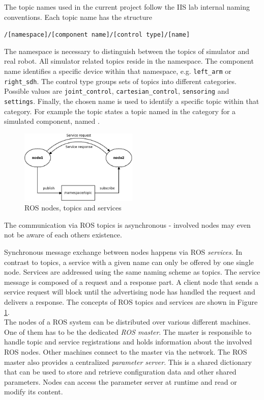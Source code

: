 The topic names used in the current project follow the IIS lab internal naming conventions. Each topic name has the structure
\begin{center}
\texttt{/[namespace]/[component name]/[control type]/[name]}
\end{center}
The namespace is necessary to distinguish between the topics of simulator and real robot. All simulator related topics reside in the  namespace. The component name identifies a specific device within that namespace, e.g. \texttt{left\_arm} or \texttt{right\_sdh}. The control type groups sets of topics into different categories. Possible values are \texttt{joint\_control}, \texttt{cartesian\_control}, \texttt{sensoring} and \texttt{settings}. Finally, the chosen name is used to identify a specific topic within that category. For example the topic  states a topic named  in the category  for a simulated component, named . \\

\begin{figure}[h]
	\centering
  \includegraphics[width=0.5\textwidth]{images/ros_concept.jpg}
	\caption{ROS nodes, topics and services}
	\label{fig:ros_concept}
\end{figure}

The communication via ROS topics is asynchronous - involved nodes may even not be aware of each others existence.

Synchronous message exchange between nodes happens via ROS \emph{services}. In contrast to topics, a service with a given name can only be offered by one single node. Services are addressed using the same naming scheme as topics. The service message is composed of a request and a response part. A client node that sends a service request will block until the advertising node has handled the request and delivers a response. The concepts of ROS topics and services are shown in Figure \ref{fig:ros_concept}.\\

The nodes of a ROS system can be distributed over various different machines. One of them has to be the dedicated \emph{ROS master}. The master is responsible to handle topic and service registrations and holds information about the involved ROS nodes. Other machines connect to the master via the network. The ROS master also provides a centralized \emph{parameter server}. This is a shared dictionary that can be used to store and retrieve configuration data and other shared parameters. Nodes can access the parameter server at runtime and read or modify its content. \\

